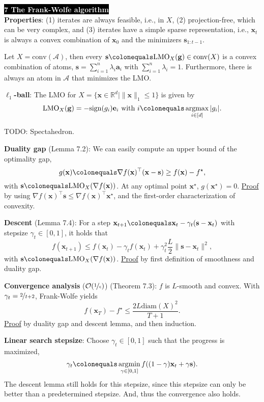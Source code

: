 \documentclass{article}
\DeclareMathOperator*{\argmax}{argmax}
\DeclareMathOperator*{\argmin}{argmin}
\newcommand{\R}{\mathbb{R}}
\renewcommand{\vec}[1]{\mathbf{#1}}
\newcommand{\transpose}[1]{#1^\top}
\newenvironment{topic}[1]
{\textbf{\sffamily \colorbox{black}{\textcolor{white}{#1}}} \\ \vspace{0.2cm}}
{}
\begin{document}
\begin{multicols*}{3}
\begin{topic}{7 The Frank-Wolfe algorithm}
        \textbf{Properties}: (1) iterates are always feasible, i.e., in $X$, (2) projection-free, which can be
        very complex, and (3) iterates have a simple sparse representation, i.e., $\vec{x}_t$ is
        always a convex combination of $\vec{x}_0$ and the minimizers $\vec{s}_{1:t-1}$.

        Let $X = \mathrm{conv}(\mathcal{A})$, then every $\vec{s} \colonequals \mathrm{LMO}_X(\vec{g}) \in
            \mathrm{conv}(X)$ is a convex combination of atoms, $\vec{s} = \sum_{i=1}^{n} \lambda_i \vec{a}_i$
        with $\sum_{i=1}^{n} \lambda_i = 1$. Furthermore, there is always an atom in $\mathcal{A}$ that
        minimizes the LMO.

        \textbf{$\ell_1$-ball}: The LMO for $X = \{ \vec{x} \in \R^d \mid \| \vec{x} \|_1 \leq 1 \}$ is given by \[
            \mathrm{LMO}_X(\vec{g}) = -\mathrm{sign}(g_i) \vec{e}_i \text{ with } i \colonequals \argmax_{i \in [d]} | g_i |.
        \]

        TODO: Spectahedron.

        \textbf{Duality gap} (Lemma 7.2): We can easily compute an upper bound of the optimality gap, \[
            g(\vec{x}) \colonequals \transpose{\nabla f(\vec{x})} (\vec{x} - \vec{s}) \geq f(\vec{x}) - f^\star,
        \]
        with $\vec{s} \colonequals \mathrm{LMO}_X(\nabla f(\vec{x}))$. At any optimal point
        $\vec{x}^\star$, $g(\vec{x}^\star) = 0$. \underline{Proof} by using $\transpose{\nabla f(\vec{x})}
            \vec{s} \leq \transpose{\nabla f(\vec{x})} \vec{x}^\star$, and the first-order characterization of
        convexity.

        \textbf{Descent} (Lemma 7.4): For a step $\vec{x}_{t+1} \colonequals \vec{x}_t - \gamma_t (\vec{s} - \vec{x}_t)$ with stepsize $\gamma_t \in [0,1]$, it holds that \[
            f(\vec{x}_{t+1}) \leq f(\vec{x}_t) - \gamma_t f(\vec{x}_t) + \gamma_t^2 \frac{L}{2} \| \vec{s} - \vec{x}_t \|^2,
        \]
        with $\vec{s} \colonequals \mathrm{LMO}_X(\nabla f(\vec{x}))$. \underline{Proof} by first
        definition of smoothness and duality gap.

        \textbf{Convergence analysis} ($\mathcal{O}(\nicefrac{1}{\epsilon})$) (Theorem 7.3): $f$ is $L$-smooth and convex. With $\gamma_t = \nicefrac{2}{t+2}$, Frank-Wolfe yields \[
            f(\vec{x}_T) - f^\star \leq \frac{2L \mathrm{diam}(X)^2}{T+1}.
        \]
        \underline{Proof} by duality gap and descent lemma, and then induction.

        \textbf{Linear search stepsize}: Choose $\gamma_t \in [0,1]$ such that the progress is maximized, \[
            \gamma_t \colonequals \argmin_{\gamma \in [0,1]} f((1-\gamma) \vec{x}_t + \gamma \vec{s}).
        \]
        The descent lemma still holds for this stepsize, since this stepsize can only be better than a
        predetermined stepsize. And, thus the convergence also holds.


\end{topic}
\end{multicols*}
\end{document}
